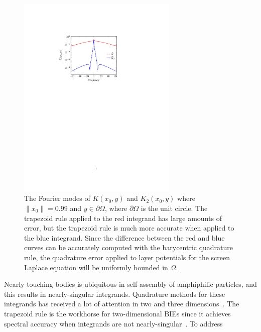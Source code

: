 \begin{figure}
\centerline{\includegraphics[width=3.0in]{figures/integrands}}
\vspace*{-10pt}
\caption{{\footnotesize The Fourier modes of $K(x_0,y)$ and $K_2(x_0,y)$
  where $\|x_0\| = 0.99$ and $y \in \partial\Omega$, where
  $\partial\Omega$ is the unit circle. The trapezoid rule applied to the
  red integrand has large amounts of error, but the trapezoid rule is
  much more accurate when applied to the blue integrand. Since the
  difference between the red and blue curves can be accurately computed
  with the barycentric quadrature rule, the quadrature error applied to
  layer potentials for the screen Laplace equation will be uniformly
  bounded in $\Omega$.}}
\label{fig:integrands}
\end{figure}
Nearly touching bodies is ubiquitous in self-assembly of amphiphilic
particles, and this results in nearly-singular integrands. Quadrature
methods for these integrands has received a lot of attention in
two and three dimensions~\cite{alpert, kapur, sidi, duffy, bruno1,
bruno2, davis_1984, graglia_2008, hackbusch_sauter_1994, jarvenpaa_2003,
khayat_2005, schwab_1992, ying_2006, beale1, beale2, goodman_1990,
haroldson_1998, lowengrub_1993, schwab_1992, ggq1, ggq2, ggq3,
helsing_2008a, helsing_integral_2009, helsing_tutorial_2012,
klockner2013jcp, qbx2, wala2019jcp, af2018sisc, siegel2018jcp,
rachh2017jcp, ding2019arxiv, bar2014}. The trapezoid rule is the
workhorse for two-dimensional BIEs since it achieves spectral accuracy
when integrands are not nearly-singular~\cite{tre-wei2014}. To address
